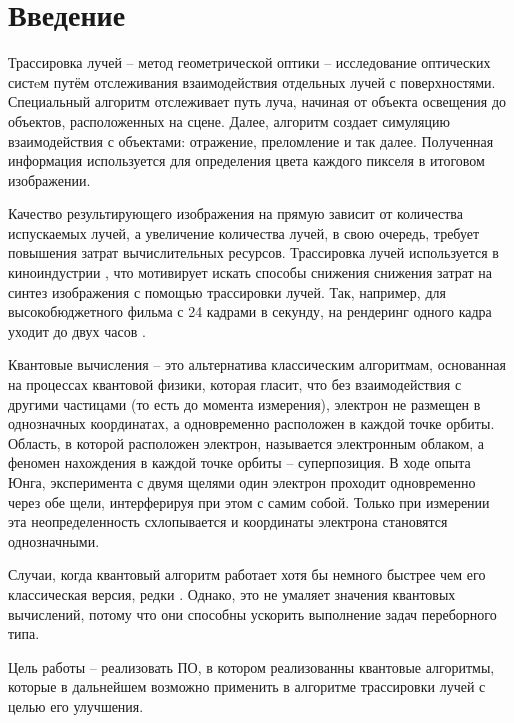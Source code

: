 \chapter*{Введение}

Трассировка лучей -- метод геометрической оптики -- исследование оптических систeм путём отслеживания взаимодействия отдельных лучей с поверхностями. Специальный алгоритм отслеживает путь луча, начиная от объекта освещения до объектов, расположенных на сцене. Далее, алгоритм создает симуляцию взаимодействия с объектами: отражение, преломление и так далее. Полученная информация используется для определения цвета каждого пикселя в итоговом изображении. 

Качество результирующего изображения на прямую зависит от количества испускаемых лучей, а увеличение количества лучей, в свою очередь, требует повышения затрат вычислительных ресурсов. Трассировка лучей используется в киноиндустрии \cite{path-traced-movies}, что мотивирует искать способы снижения снижения затрат на синтез изображения с помощью трассировки лучей. Так, например, для высокобюджетного фильма с 24 кадрами в секунду, на рендеринг одного кадра уходит до двух часов \cite{path-traced-movies}.

Квантовые вычисления -- это альтернатива классическим алгоритмам, основанная на процессах квантовой физики, которая гласит, что без взаимодействия с другими частицами (то есть до момента измерения), электрон не размещен в однозначных координатах, а одновременно расположен в каждой точке орбиты. Область, в которой расположен электрон, называется электронным облаком, а феномен нахождения в каждой точке орбиты -- суперпозиция. В ходе опыта Юнга, эксперимента с двумя щелями один электрон проходит одновременно через обе щели, интерферируя при этом с самим собой. Только при измерении эта неопределенность схлопывается и координаты электрона становятся однозначными.

Случаи, когда квантовый алгоритм работает хотя бы немного быстрее чем его классическая версия, редки \cite{quantum-computers-speed-up}. Однако, это не умаляет значения квантовых вычислений, потому что они способны ускорить выполнение задач переборного типа. 

Цель работы -- реализовать ПО, в котором реализованны квантовые алгоритмы, которые в дальнейшем возможно применить в алгоритме трассировки лучей с целью его улучшения.

